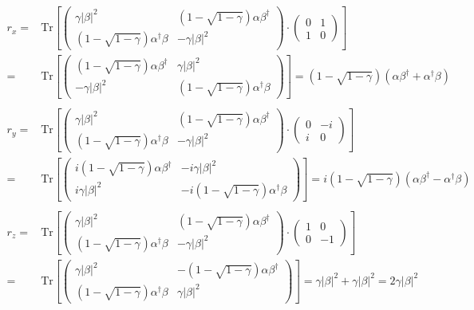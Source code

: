 \begin{equation} \label{eq:bloch_ap}
  \begin{split}
    r_{x} = &  \text{Tr} \left[ \begin{pmatrix}
  \gamma |\beta|^{2} & (1-\sqrt{1-\gamma}) \alpha \beta^{\dag}\\
  (1-\sqrt{1-\gamma}) \alpha^{\dag} \beta & -\gamma |\beta|^{2} 
  \end{pmatrix} \cdot \begin{pmatrix}
  0&1\\
  1&0
  \end{pmatrix} \right]  \\
  = & \text{Tr} \left[ \begin{pmatrix}
  (1-\sqrt{1-\gamma}) \alpha \beta^{\dag} & \gamma |\beta|^{2}\\
  -\gamma |\beta|^{2} & (1-\sqrt{1-\gamma}) \alpha^{\dag} \beta
  \end{pmatrix} \right] = (1-\sqrt{1-\gamma}) (\alpha \beta^{\dag}  + \alpha^{\dag} \beta) \\
  & \\
  r_{y} = &  \text{Tr} \left[ \begin{pmatrix}
  \gamma |\beta|^{2} & (1-\sqrt{1-\gamma}) \alpha \beta^{\dag}\\
  (1-\sqrt{1-\gamma}) \alpha^{\dag} \beta & -\gamma |\beta|^{2}
  \end{pmatrix} \cdot \begin{pmatrix}
  0&-i\\
  i&0
  \end{pmatrix} \right]  \\
  = & \text{Tr} \left[ \begin{pmatrix}
  i (1-\sqrt{1-\gamma}) \alpha \beta^{\dag} & -i \gamma |\beta|^{2}\\
  i \gamma |\beta|^{2} & -i (1-\sqrt{1-\gamma}) \alpha^{\dag} \beta
  \end{pmatrix} \right] = i(1-\sqrt{1-\gamma}) (\alpha \beta^{\dag} - \alpha^{\dag} \beta) \\
  & \\
  r_{z} = &  \text{Tr} \left[ \begin{pmatrix}
  \gamma |\beta|^{2} & (1-\sqrt{1-\gamma}) \alpha \beta^{\dag}\\
  (1-\sqrt{1-\gamma}) \alpha^{\dag} \beta & - \gamma |\beta|^{2}
  \end{pmatrix} \cdot \begin{pmatrix}
  1&0\\
  0&-1
  \end{pmatrix} \right]  \\
  = & \text{Tr} \left[ \begin{pmatrix}
  \gamma |\beta|^{2} & -(1-\sqrt{1-\gamma}) \alpha \beta^{\dag}\\
  (1-\sqrt{1-\gamma}) \alpha^{\dag} \beta & \gamma |\beta|^{2}
  \end{pmatrix} \right] = \gamma |\beta|^{2} + \gamma |\beta|^{2} = 2\gamma |\beta|^{2}
  \end{split}
  \end{equation}
